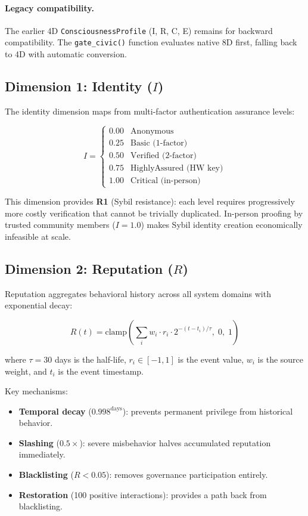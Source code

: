 \documentclass[11pt,twocolumn]{article}
\begin{document}
\paragraph{Legacy compatibility.} The earlier 4D \texttt{ConsciousnessProfile} (I, R, C, E) remains for backward compatibility. The \texttt{gate\_civic()} function evaluates native 8D first, falling back to 4D with automatic conversion.

\subsection{Dimension 1: Identity ($I$)}

The identity dimension maps from multi-factor authentication assurance levels:

\begin{equation}
  I = \begin{cases}
    0.00 & \text{Anonymous} \\
    0.25 & \text{Basic (1-factor)} \\
    0.50 & \text{Verified (2-factor)} \\
    0.75 & \text{HighlyAssured (HW key)} \\
    1.00 & \text{Critical (in-person)}
  \end{cases}
\end{equation}

This dimension provides \textbf{R1} (Sybil resistance): each level requires
progressively more costly verification that cannot be trivially duplicated.
In-person proofing by trusted community members ($I = 1.0$) makes Sybil
identity creation economically infeasible at scale.

\subsection{Dimension 2: Reputation ($R$)}

Reputation aggregates behavioral history across all system domains with
exponential decay:

\begin{equation}
  R(t) = \text{clamp}\left(\sum_{i} w_i \cdot r_i \cdot 2^{-(t - t_i)/\tau}, \; 0, \; 1\right)
\end{equation}

where $\tau = 30$ days is the half-life, $r_i \in [-1, 1]$ is the event
value, $w_i$ is the source weight, and $t_i$ is the event timestamp.

Key mechanisms:
\begin{itemize}[nosep]
  \item \textbf{Temporal decay} ($0.998^{\text{days}}$): prevents permanent
    privilege from historical behavior.
  \item \textbf{Slashing} ($0.5\times$): severe misbehavior halves accumulated
    reputation immediately.
  \item \textbf{Blacklisting} ($R < 0.05$): removes governance participation
    entirely.
  \item \textbf{Restoration} (100 positive interactions): provides a path
    back from blacklisting.
\end{itemize}
\end{document}
